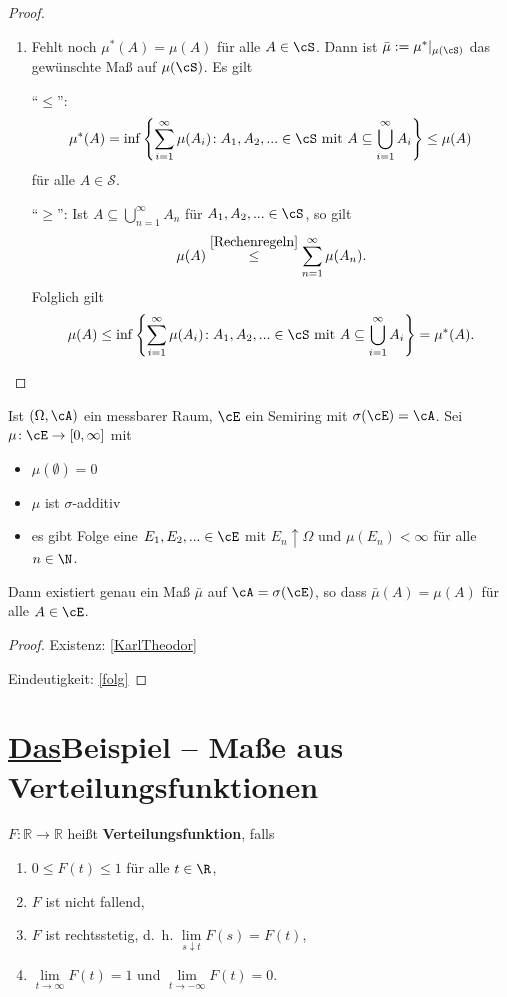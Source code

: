 \begin{proof}
\begin{enumerate}[label=(\alph*)]
		\item Fehlt noch $\mu^{*}(A) = \mu(A)$ für alle $A \in \cS$. Dann ist $\bar{\mu} := \mu^{*}|_{\mu(\cS)}$ das gewünschte Maß auf $\mu(\cS)$. Es gilt
		
		\enquote{$\leq$}: \[ \mu^{*}(A) = \inf\left\{ \sum\limits_{i=1}^{\infty} \mu(A_i) \! : A_1,A_2,... \in \cS \text{ mit } A \subseteq \bigcup\limits_{i = 1}^{\infty} A_i \right\} \leq \mu(A) \:  \]f\"ur alle $A\in \mathcal S$.
		
		\enquote{$\geq$}:  Ist $A \subseteq \bigcup\limits_{n=1}^{\infty} A_n$ f\"ur $A_1,A_2,... \in \cS$, 
		so gilt \[ \mu(A) \overset{\ref{Rechenregeln}}{\leq} \sum\limits_{n=1}^{\infty} \mu(A_n). \] Folglich gilt \[ \mu(A) \leq \inf\left\{ \sum\limits_{i=1}^{\infty} \mu(A_i) \! : A_1,A_2,... \in \cS \text{ mit } A \subseteq \bigcup\limits_{i = 1}^{\infty} A_i \right\} = \mu^{*}(A). \]		
		
	\end{enumerate}
\end{proof}

\begin{satz} \label{ExistMasse}
	Ist $(\Omega, \cA)$ ein messbarer Raum, $\cE$ ein Semiring mit $\sigma(\cE) = \cA$. Sei $\mu \! : \cE \rightarrow [0,\infty]$ mit
	\begin{itemize}
		\item $\mu(\emptyset) = 0$
		\item $\mu$ ist $\sigma$-additiv
		\item es gibt Folge eine $E_1,E_2,... \in \cE$ mit $E_n \uparrow \Omega$ und $\mu(E_n) < \infty$ f\"ur alle $n\in\N$.
	\end{itemize}
	Dann existiert genau ein Maß $\bar{\mu}$ auf $\cA = \sigma(\cE)$, so dass $\bar{\mu}(A) = \mu(A)$ f\"ur alle $A\in \cE$.
\end{satz}

\begin{proof}\abs\par
	Existenz: \ref{KarlTheodor}
	
	Eindeutigkeit: \ref{folg} 
\end{proof}

\section{\mbox{\underline{Das}\platz Beispiel} -- Maße aus Verteilungsfunktionen}

\begin{deff}
	$F \! : \mathbb{R} \rightarrow \mathbb{R}$ heißt \textbf{Verteilungsfunktion}, falls 
	\begin{enumerate}[label=(\roman*)]
		\item $0 \leq F(t) \leq 1$ f\"ur alle $t\in\R$,
		\item $F$ ist nicht fallend,
		\item $F$ ist rechtsstetig, \mbox{d. h.} $\lim\limits_{s \downarrow t} F(s) = F(t)$,
		\item $\lim\limits_{t \to \infty} F(t) = 1$ und $\lim\limits_{t \to - \infty} F(t) = 0$.
	\end{enumerate}
\end{deff}

